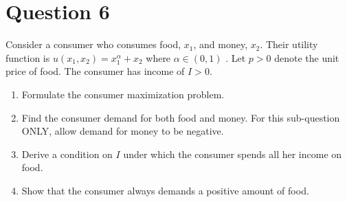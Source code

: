 \documentclass{article}
\begin{document}
\section*{Question 6}
Consider a consumer who consumes food, $x_1$, and money, $x_2$. Their utility function is $u(x_1, x_2) = x_1^{\alpha} + x_2$ where $\alpha\in(0,1)$ . Let $p>0$ denote the unit price of food. The consumer has income of $I>0$.
\begin{enumerate}
\item  Formulate the consumer maximization problem.
\item  Find the consumer demand for both food and money. For this sub-question ONLY, allow demand for money to be negative.
\item Derive a condition on $I$ under which the consumer spends
all her income on food.
\item Show that the consumer
always demands a positive amount of food.
\end{enumerate}
\end{document}
